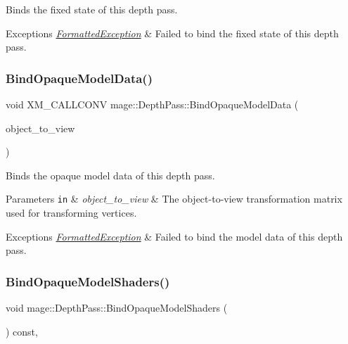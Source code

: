 Binds the fixed state of this depth pass.


\begin{DoxyExceptions}{Exceptions}
{\em \hyperlink{structmage_1_1_formatted_exception}{Formatted\+Exception}} & Failed to bind the fixed state of this depth pass. \\
\hline
\end{DoxyExceptions}
\hypertarget{classmage_1_1_depth_pass_a674fc5fe2e8cae4c704a554dc8bc1fdd}{}\label{classmage_1_1_depth_pass_a674fc5fe2e8cae4c704a554dc8bc1fdd} 
\subsubsection{\texorpdfstring{Bind\+Opaque\+Model\+Data()}{BindOpaqueModelData()}}
{\footnotesize\ttfamily void X\+M\+\_\+\+C\+A\+L\+L\+C\+O\+NV mage\+::\+Depth\+Pass\+::\+Bind\+Opaque\+Model\+Data (\begin{DoxyParamCaption}\item[{F\+X\+M\+M\+A\+T\+R\+IX}]{object\+\_\+to\+\_\+view }\end{DoxyParamCaption})\hspace{0.3cm}{\ttfamily [private]}}

Binds the opaque model data of this depth pass.


\begin{DoxyParams}[1]{Parameters}
\mbox{\tt in}  & {\em object\+\_\+to\+\_\+view} & The object-\/to-\/view transformation matrix used for transforming vertices. \\
\hline
\end{DoxyParams}

\begin{DoxyExceptions}{Exceptions}
{\em \hyperlink{structmage_1_1_formatted_exception}{Formatted\+Exception}} & Failed to bind the model data of this depth pass. \\
\hline
\end{DoxyExceptions}
\hypertarget{classmage_1_1_depth_pass_a6e10b136e64265fa36b9152353946bdc}{}\label{classmage_1_1_depth_pass_a6e10b136e64265fa36b9152353946bdc} 
\subsubsection{\texorpdfstring{Bind\+Opaque\+Model\+Shaders()}{BindOpaqueModelShaders()}}
{\footnotesize\ttfamily void mage\+::\+Depth\+Pass\+::\+Bind\+Opaque\+Model\+Shaders (\begin{DoxyParamCaption}{ }\end{DoxyParamCaption}) const\hspace{0.3cm}{\ttfamily [private]}, {\ttfamily [noexcept]}}


